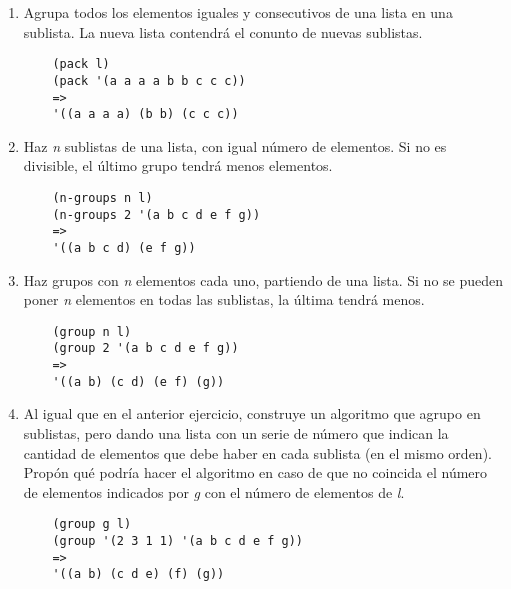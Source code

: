 \documentclass[11pt]{article}
\begin{document}
\begin{enumerate}
  \item Agrupa todos los elementos iguales y consecutivos de una lista en una sublista. La nueva lista contendrá el conunto de nuevas sublistas.
\begin{verbatim}
    (pack l)
    (pack '(a a a a b b c c c))
    =>
    '((a a a a) (b b) (c c c))
\end{verbatim}

  \item Haz \textit{n} sublistas de una lista, con igual número de elementos. Si no es divisible, el último grupo tendrá menos elementos.
\begin{verbatim}
    (n-groups n l)
    (n-groups 2 '(a b c d e f g))
    =>
    '((a b c d) (e f g))
\end{verbatim}

  \item Haz grupos con \textit{n} elementos cada uno, partiendo de una lista. Si no se pueden poner \textit{n} elementos en todas las sublistas, la última tendrá menos.
\begin{verbatim}
    (group n l)
    (group 2 '(a b c d e f g))
    =>
    '((a b) (c d) (e f) (g))
\end{verbatim}

  \item Al igual que en el anterior ejercicio, construye un algoritmo que agrupo en sublistas, pero dando una lista con un serie de número que indican la cantidad de elementos que debe haber en cada sublista (en el mismo orden). Propón qué podría hacer el algoritmo en caso de que no coincida el número de elementos indicados por \textit{g} con el número de elementos de \textit{l}.
\begin{verbatim}
    (group g l)
    (group '(2 3 1 1) '(a b c d e f g))
    =>
    '((a b) (c d e) (f) (g))
\end{verbatim}


\end{enumerate}
\end{document}
